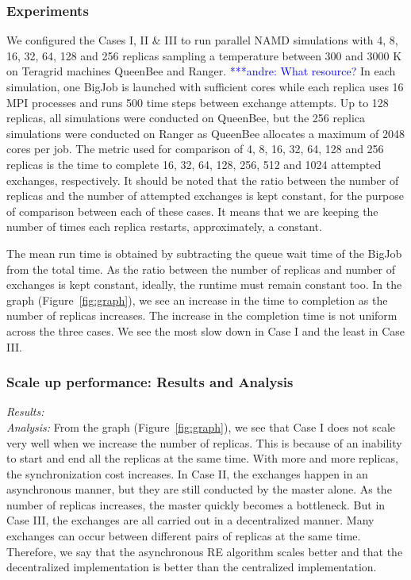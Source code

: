\documentclass{rspublic}
\newcommand{\alnote}[1]{ {\textcolor{blue} { ***andre: #1 }}}
\newcommand{\alnote}[1]{}
\begin{document}
\subsubsection{Experiments}
We configured the Cases I, II \& III to run parallel NAMD simulations with 4, 8, 16, 32, 64, 128 and 256 replicas sampling a temperature between 300 and 3000 K on Teragrid machines QueenBee and Ranger. \alnote{What resource?} In each simulation, one BigJob is launched with sufficient cores while each replica uses 16 MPI processes and runs 500 time steps between exchange attempts. Up to 128 replicas, all simulations were conducted on QueenBee, but the 256 replica simulations were conducted on Ranger as QueenBee allocates a maximum of 2048 cores per job. The metric used for comparison of 4, 8, 16, 32, 64, 128 and 256 replicas is the time to complete 16, 32, 64, 128, 256, 512 and 1024 attempted exchanges, respectively. It should be noted that the ratio between the number of replicas and the number of attempted exchanges is kept constant, for the purpose of comparison between each of these cases. It means that we are keeping the number of times each replica restarts, approximately, a constant. 

The mean run time is obtained by subtracting the queue wait time of the BigJob from the total time. As the ratio between the number of replicas and number of exchanges is kept constant, ideally, the runtime must remain constant too. In the graph (Figure~\ref{fig:graph}), we see an increase in the time to completion as the number of replicas increases. The increase in the completion time is not uniform across the three cases. We see the most slow down in Case I and the least in Case III.

\subsubsection{Scale up performance: Results and Analysis}

{\it Results:}\\

{\it Analysis: } From the graph (Figure~\ref{fig:graph}), we see that
Case I does not scale very well when we increase the number of
replicas. This is because of an inability to start and end all the
replicas at the same time. With more and more replicas, the
synchronization cost increases.  In Case II, the exchanges happen in
an asynchronous manner, but they are still conducted by the master
alone. As the number of replicas increases, the master quickly becomes
a bottleneck. But in Case III, the exchanges are all carried out in a
decentralized manner. Many exchanges can occur between different pairs
of replicas at the same time. Therefore, we say that the asynchronous
RE algorithm scales better and that the decentralized implementation
is better than the centralized implementation.
\end{document}
